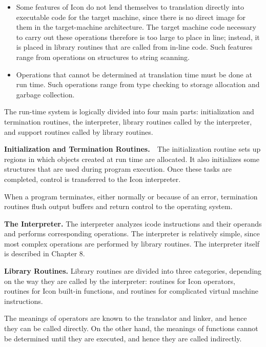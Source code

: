 \liststyleLiii
\begin{itemize}

\item Some features of Icon do not lend themselves to translation
directly into executable code for the target machine, since there is
no direct image for them in the target-machine architecture. The
target machine code necessary to carry out these operations therefore
is too large to place in line; instead, it is placed in library
routines that are called from in-line code. Such features range from
operations on structures to string scanning.

\item Operations that cannot be determined at translation time must be
done at run time. Such operations range from type checking to storage
allocation and garbage collection.

\end{itemize}

The run-time system is logically divided into four main parts:
initialization and termination routines, the interpreter, library
routines called by the interpreter, and support routines called by
library routines.


\textbf{Initialization and Termination Routines.}\ \ The
initialization routine sets up regions in which objects created at run
time are allocated. It also initializes some structures that are used
during program execution. Once these tasks are completed, control is
transferred to the Icon interpreter.

When a program terminates, either normally or because of an error,
termination routines flush output buffers and return control to the
operating system.

\textbf{The Interpreter.} The interpreter analyzes icode instructions
and their operands and performs corresponding operations. The
interpreter is relatively simple, since most complex operations are
performed by library routines. The interpreter itself is described in
Chapter 8.

\textbf{Library Routines. }Library routines are divided into three
categories, depending on the way they are called by the interpreter:
routines for Icon operators, routines for Icon built-in functions, and
routines for complicated virtual machine instructions.

The meanings of operators are known to the translator and linker, and
hence they can be called directly. On the other hand, the meanings of
functions cannot be determined until they are executed, and hence they
are called indirectly.

